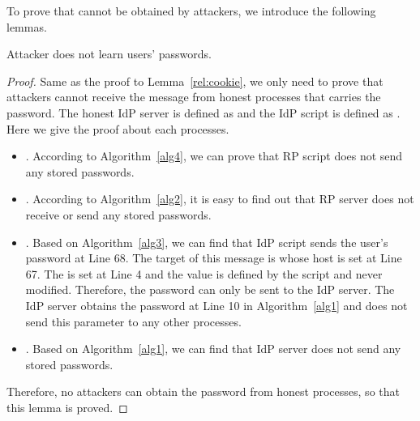 To prove that  cannot be obtained by attackers, we introduce the following lemmas.
\begin{relemma}
Attacker does not learn users' passwords.
\label{rel:password}
\end{relemma}
\begin{proof}
Same as the proof to Lemma~\ref{rel:cookie}, we only need to prove that attackers cannot receive the message from honest processes that carries the password. The honest IdP server is defined as  and the IdP script is defined as . Here we give the proof about each processes.
\begin{itemize}
\setlength\itemsep{-2pt}
\item {}. According to Algorithm~\ref{alg4}, we can prove that RP script does not send any stored passwords.
\item {}. According to Algorithm~\ref{alg2}, it is easy to find out that RP server does not receive or send any stored passwords.
\item {}. Based on Algorithm~\ref{alg3}, we can find that IdP script sends the user's password at Line 68. The target of this message is  whose host is  set at Line 67. The  is set at Line 4 and the value is defined  by the script and never modified. Therefore, the password can only be sent to the IdP server. The IdP server obtains the password at Line 10 in Algorithm~\ref{alg1}  and does not send this parameter to any other processes.
\item {}. Based on Algorithm~\ref{alg1},  we can find that IdP server does not send any stored passwords.
\end{itemize}
Therefore, no attackers can obtain the password from honest processes, so that this lemma is proved.
\end{proof}

